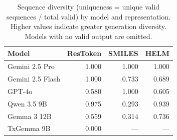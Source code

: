\begin{table}[htbp]
\centering
\caption{Sequence diversity (uniqueness = unique valid sequences / total valid) by model and representation. Higher values indicate greater generation diversity. Models with no valid output are omitted.}
\label{tab:w2-exp1-diversity}
\small
\begin{tabular}{l rrr}
\toprule
Model & ResToken & SMILES & HELM \\
\midrule
Gemini 2.5 Pro & 1.000 & 1.000 & 1.000 \\
Gemini 2.5 Flash & 1.000 & 0.733 & 0.689 \\
GPT-4o & 0.580 & 1.000 & 0.605 \\
Qwen 3.5 9B & 0.975 & 0.293 & 0.939 \\
Gemma 3 12B & 0.559 & 0.314 & 0.736 \\
TxGemma 9B & 0.000 & --- & --- \\
\bottomrule
\end{tabular}
\end{table}